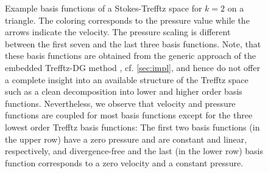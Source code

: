 \documentclass[pdflatex,sn-mathphys,Numbered]{sn-jnl}%
\theoremstyle{remark}%
\theoremstyle{definition}%
\begin{document}
\begin{figure}[!ht]
    \caption{Example basis functions of a Stokes-Trefftz space for
    $k=2$ on a triangle. The coloring corresponds to the pressure
    value while the arrows indicate the velocity. The pressure scaling
    is different between the first seven and the last three basis
    functions. Note, that these basis functions are obtained from the
    generic approach of the embedded Trefftz-DG method
    \cite{2201.07041}, cf. \cref{sec:impl}, and hence do not offer a
    complete insight into an available structure of the Trefftz space
    such as a clean decomposition into lower and higher order basis
    functions. Nevertheless, we observe that velocity and pressure
    functions are coupled for most basis functions except for the
    three lowest order Trefftz basis functions: The first two basis
    functions (in the upper row) have a zero pressure and are constant
    and linear, respectively, and divergence-free and the last (in the
    lower row) basis function corresponds to a zero velocity and a
    constant pressure.}
    \label{fig:trefftzbasis}
\end{figure}
\end{document}
